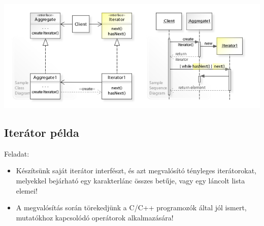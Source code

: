 \begin{frame}
    \begin{center}
        \includegraphics[width=\textwidth]{iterator.jpeg} \\
        \tiny {}
    \end{center}
\end{frame}

\subsection{Iterátor példa}

\begin{frame}
    Feladat:
    \begin{itemize}
        \item Készítsünk saját iterátor interfészt, és azt megvalósító tényleges iterátorokat, melyekkel bejárható egy karakterlánc összes betűje, vagy egy láncolt lista elemei!
        \item A megvalósítás során törekedjünk a C/C++ programozók által jól ismert, mutatókhoz kapcsolódó operátorok alkalmazására!
    \end{itemize}
\end{frame}

